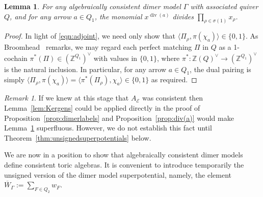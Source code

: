 \documentclass[11pt,a4paper]{amsart}
\numberwithin{equation}{section}
\newtheorem{lemma}[theorem]{Lemma}
\theoremstyle{definition}
\theoremstyle{remark}
\newtheorem{remark}[theorem]{Remark}
\newcommand{\ZZ}{\ensuremath{\mathbb{Z}}}
\renewcommand{\div}{\operatorname{div}}
\begin{document}
\begin{lemma}
\label{lem:multiplicity} 
For any algebraically consistent dimer model $\Gamma$ with associated quiver $Q$, and for any arrow $a\in Q_1$, the monomial $x^{\div(a)}$ divides $\prod_{\rho\in \sigma(1)} x_\rho$.
\end{lemma}
\begin{proof}
In light of \eqref{eqn:adjoint}, we need only show that $\langle \Pi_\rho, \pi(\chi_a)\rangle \in \{0,1\}$. As Broomhead~\cite[\S 2.3]{Broomhead} remarks, we may regard each perfect matching $\Pi$ in $Q$ as a 1-cochain $\pi^*(\Pi)\in (\ZZ^{Q_1})^\vee$ with values in $\{0,1\}$, where $\pi^*\colon \ZZ(Q)^\vee\to (\ZZ^{Q_1})^\vee$ is the natural inclusion. In particular, for any arrow $a\in Q_1$, the dual pairing is simply $\langle \Pi_\rho, \pi(\chi_a)\rangle = \langle \pi^*(\Pi_\rho), \chi_a\rangle \in \{0,1\}$ as required.
\end{proof}

\begin{remark}
If we knew at this stage that $A_\mathscr{E}$ was consistent then Lemma~\ref{lem:Kergens} could be applied directly in the proof of Proposition~\ref{prop:dimerlabels} and Proposition~\ref{prop:div(a)} would make Lemma~\ref{lem:multiplicity} superfluous. However, we do not establish this fact until Theorem~\ref{thm:unsignedsuperpotentials} below.
\end{remark}

We are now in a position to show that algebraically consistent dimer models define consistent toric algebras. 
 It is convenient to introduce temporarily the unsigned version of the dimer model superpotential, namely, the element $\overline{W}_\Gamma :=  \sum_{F\in Q_2} w_F$.
 
\end{document}
